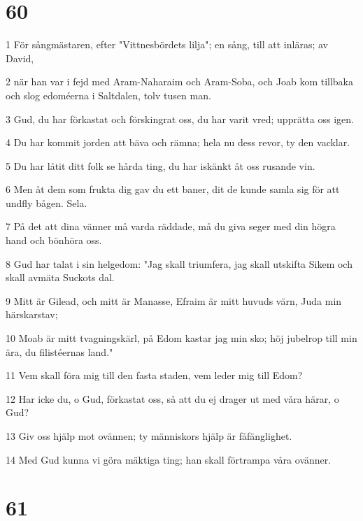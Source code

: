 \chapter{60}

\par 1 För sångmästaren, efter "Vittnesbördets lilja"; en sång, till att inläras; av David,
\par 2 när han var i fejd med Aram-Naharaim och Aram-Soba, och Joab kom tillbaka och slog edoméerna i Saltdalen, tolv tusen man.
\par 3 Gud, du har förkastat och förskingrat oss, du har varit vred; upprätta oss igen.
\par 4 Du har kommit jorden att bäva och rämna; hela nu dess revor, ty den vacklar.
\par 5 Du har låtit ditt folk se hårda ting, du har iskänkt åt oss rusande vin.
\par 6 Men åt dem som frukta dig gav du ett baner, dit de kunde samla sig för att undfly bågen. Sela.
\par 7 På det att dina vänner må varda räddade, må du giva seger med din högra hand och bönhöra oss.
\par 8 Gud har talat i sin helgedom: "Jag skall triumfera, jag skall utskifta Sikem och skall avmäta Suckots dal.
\par 9 Mitt är Gilead, och mitt är Manasse, Efraim är mitt huvuds värn, Juda min härskarstav;
\par 10 Moab är mitt tvagningskärl, på Edom kastar jag min sko; höj jubelrop till min ära, du filistéernas land."
\par 11 Vem skall föra mig till den fasta staden, vem leder mig till Edom?
\par 12 Har icke du, o Gud, förkastat oss, så att du ej drager ut med våra härar, o Gud?
\par 13 Giv oss hjälp mot ovännen; ty människors hjälp är fåfänglighet.
\par 14 Med Gud kunna vi göra mäktiga ting; han skall förtrampa våra ovänner.

\chapter{61}

